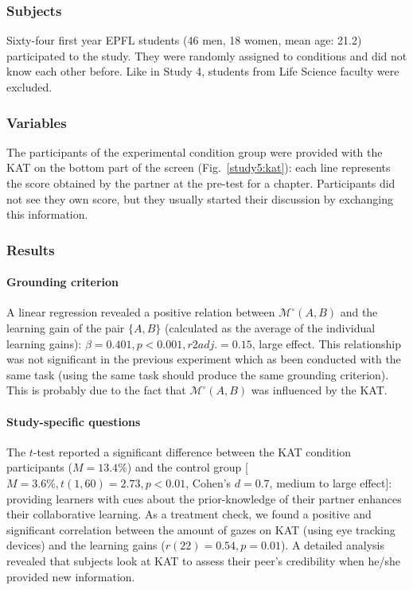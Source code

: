 \documentclass[natbib]{svjour3}
\newcommand{\gModel}[2]{{$\mathcal{M}^{\circ}(#1, #2)$}}
\begin{document}
\subsubsection*{Subjects}

Sixty-four first year EPFL students (46 men, 18 women, mean age: 21.2)
participated to the study. They were randomly assigned to conditions and
did not know each other before. Like in Study 4, students from Life Science
faculty were excluded.

\subsubsection*{Variables}

The participants of the experimental condition group were provided with the KAT
on the bottom part of the screen (Fig.~\ref{study5:kat}): each line represents
the score obtained by the partner at the pre-test for a chapter. Participants
did not see they own score, but they usually started their discussion by
exchanging this information.

\subsubsection*{Results}

\paragraph{Grounding criterion} A linear regression revealed a positive relation
between \gModel{A}{B} and the learning gain of the pair $\{A, B\}$ (calculated
as the average of the individual learning gains): $\beta= 0.401, p < 0.001, r2adj.
= 0.15$, large effect. This relationship was not significant in the previous
experiment which as been conducted with the same task (using the same task
should produce the same grounding criterion). This is probably due to the fact that
\gModel{A}{B} was influenced by the KAT.

\paragraph{Study-specific questions} The $t$-test reported a significant
difference between the KAT condition participants ($M = 13.4\%$) and the control
group [$M = 3.6\%, t(1, 60) = 2.73, p < 0.01$, Cohen's $d = 0.7$, medium to large
effect]: providing learners with cues about the prior-knowledge of their partner
enhances their collaborative learning. As a treatment check, we found a positive
and significant correlation between the amount of gazes on KAT (using eye
tracking devices) and the learning gains ($r(22) = 0.54, p = 0.01$). A detailed
analysis revealed that subjects look at KAT to assess their peer's credibility
when he/she provided new information. 
\end{document}
